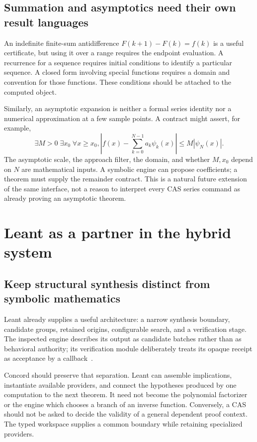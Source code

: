 \documentclass[11pt,a4paper]{article}
\theoremstyle{remark}
\begin{document}
\subsection{Summation and asymptotics need their own result languages}
An indefinite finite-sum antidifference $F(k+1)-F(k)=f(k)$ is a useful certificate,
but using it over a range requires the endpoint evaluation. A recurrence for a
sequence requires initial conditions to identify a particular sequence.
A closed form involving special functions requires a domain and convention for
those functions. These conditions should be attached to the computed object.

Similarly, an asymptotic expansion is neither a formal series identity nor a
numerical approximation at a few sample points. A contract might assert, for
example,
\[
 \exists M>0\;\exists x_0\;\forall x\ge x_0,
 \left|f(x)-\sum_{k=0}^{N-1}a_k\psi_k(x)\right|
 \le M|\psi_N(x)|.
\]
The asymptotic scale, the approach filter, the domain, and whether $M,x_0$ depend
on $N$ are mathematical inputs. A symbolic engine can propose coefficients;
a theorem must supply the remainder contract. This is a natural future extension
of the same interface, not a reason to interpret every CAS series command as
already proving an asymptotic theorem.

\section{Leant as a partner in the hybrid system}
\label{sec:leant}
\subsection{Keep structural synthesis distinct from symbolic mathematics}
Leant already supplies a useful architecture: a narrow synthesis boundary,
candidate groups, retained origins, configurable search, and a verification
stage. The inspected engine describes its output as candidate batches rather
than as behavioral authority; its verification module deliberately treats its
opaque receipt as acceptance by a callback~\cite{lengine,lverify}.

Concord should preserve that separation. Leant can assemble implications,
instantiate available providers, and connect the hypotheses produced by one
computation to the next theorem. It need not become the polynomial factorizer
or the engine which chooses a branch of an inverse function. Conversely, a CAS
should not be asked to decide the validity of a general dependent proof context.
The typed workspace supplies a common boundary while retaining specialized
providers.
\end{document}
